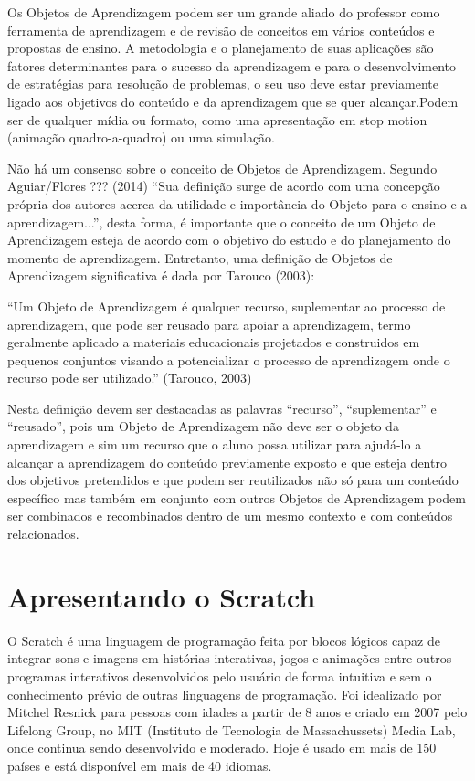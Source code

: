 \documentclass[12pt, openright, a4paper, brazil, openany, oneside]{abntex2}
\begin{document}
Os Objetos de Aprendizagem podem ser um grande aliado do professor como ferramenta de aprendizagem e de revisão de conceitos em vários conteúdos e propostas de ensino. A metodologia e o planejamento de suas aplicações são fatores determinantes para o sucesso da aprendizagem e para o desenvolvimento de estratégias para resolução de problemas, o seu uso deve estar previamente ligado aos objetivos do conteúdo e da aprendizagem que se quer alcançar.Podem ser de qualquer mídia ou formato, como uma apresentação em stop motion (animação quadro-a-quadro) ou uma simulação.

Não há um consenso sobre o conceito de Objetos de Aprendizagem. Segundo Aguiar/Flores ??? (2014) ``Sua definição surge de acordo com uma concepção própria dos autores acerca da utilidade e importância do Objeto para o ensino e a aprendizagem...'', desta forma, é importante que o conceito de um Objeto de Aprendizagem esteja de acordo com o objetivo do estudo e do planejamento do momento de aprendizagem. Entretanto, uma definição de Objetos de Aprendizagem significativa é dada por Tarouco (2003):


\begin{citacao}

``Um Objeto de Aprendizagem é qualquer recurso, suplementar ao processo de aprendizagem, que pode ser reusado para apoiar a aprendizagem, termo geralmente aplicado a materiais educacionais projetados e construidos em pequenos conjuntos visando a potencializar o processo de aprendizagem onde o recurso pode ser utilizado.''\cite{tarouco} (Tarouco, 2003)

\end{citacao}

Nesta definição devem ser destacadas as palavras ``recurso'', ``suplementar'' e ``reusado'', pois um Objeto de Aprendizagem não deve ser o objeto da aprendizagem e sim um recurso que o aluno possa utilizar para ajudá-lo a alcançar a aprendizagem do conteúdo previamente exposto e que esteja dentro dos objetivos pretendidos e que podem ser reutilizados não só para um conteúdo específico mas também em conjunto com outros Objetos de Aprendizagem podem ser combinados e recombinados dentro de um mesmo contexto e com conteúdos relacionados.

\chapter{Apresentando o Scratch}

 O Scratch é uma linguagem de programação feita por blocos lógicos capaz de integrar sons e imagens em histórias interativas, jogos e animações entre outros programas interativos desenvolvidos pelo usuário de forma intuitiva e sem o conhecimento prévio de outras linguagens de programação. Foi idealizado por Mitchel Resnick para pessoas com idades a partir de 8 anos e criado em 2007 pelo Lifelong Group, no MIT (Instituto de Tecnologia de Massachussets) Media Lab, onde continua sendo desenvolvido e moderado.  Hoje é usado em mais de 150 países e está disponível em mais de 40 idiomas.
 
\end{document}
